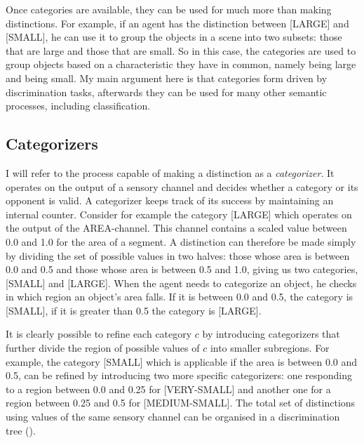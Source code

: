 Once categories are available, they can be 
used for much more than making distinctions. For example, 
if an agent has the distinction between [LARGE] and [SMALL],
he can use it to group the objects in a scene into two
subsets: those that are large and those that are small. 
So in this case, the categories are used to group 
objects based on a characteristic they have in common, 
namely being large and being small. My main argument here is that 
categories form driven by discrimination tasks,
afterwards they can be used for many other 
semantic processes, including classification. 

\subsection{Categorizers}

I will refer to the process capable of making a distinction as
a {\itshape categorizer}. %
It operates on the output of 
a sensory channel and decides whether a category or its opponent
is valid. A categorizer keeps track of its success 
by maintaining an internal counter. 
Consider for example the category [LARGE] which 
operates on the output of the AREA-channel. This channel 
contains a scaled value 
between 0.0 and 1.0 for the area of a segment. A distinction 
can therefore be 
made simply by dividing the set of possible values in two
halves: those whose area is between
0.0 and 0.5 and those whose area is between 0.5 and
1.0, giving us two categories, [SMALL] and [LARGE]. When 
the agent needs to categorize an object, he checks in which
region an object's area falls. If it is between 0.0 and 0.5, the
category is [SMALL], if it is greater than 0.5 the category
is [LARGE]. 

It is clearly possible to refine each 
category $c$ by introducing categorizers that 
further divide the region of possible values of $c$ into 
smaller subregions. For example, the category [SMALL] which 
is applicable if the area is between 0.0 and 0.5, can be refined 
by introducing two more specific categorizers: one responding
to a region between 0.0 and 
0.25 for [VERY-SMALL] and another one for a region
between 0.25 and 0.5 for [MEDIUM-SMALL]. The total set of
distinctions using values of the same sensory channel
can be organised in a discrimination tree (). 

